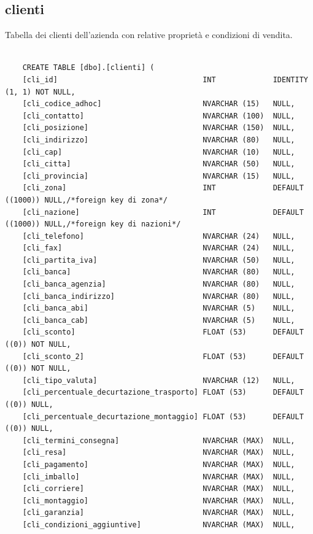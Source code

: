 \documentclass[12pt]{article}
\begin{document}
\subsection{clienti}
Tabella dei clienti dell'azienda con relative proprietà e condizioni di vendita.
\begin{lstlisting}

    CREATE TABLE [dbo].[clienti] (
    [cli_id]                                 INT             IDENTITY (1, 1) NOT NULL,
    [cli_codice_adhoc]                       NVARCHAR (15)   NULL,
    [cli_contatto]                           NVARCHAR (100)  NULL,
    [cli_posizione]                          NVARCHAR (150)  NULL,
    [cli_indirizzo]                          NVARCHAR (80)   NULL,
    [cli_cap]                                NVARCHAR (10)   NULL,
    [cli_citta]                              NVARCHAR (50)   NULL,
    [cli_provincia]                          NVARCHAR (15)   NULL,
    [cli_zona]                               INT             DEFAULT ((1000)) NULL,/*foreign key di zona*/
    [cli_nazione]                            INT             DEFAULT ((1000)) NULL,/*foreign key di nazioni*/
    [cli_telefono]                           NVARCHAR (24)   NULL,
    [cli_fax]                                NVARCHAR (24)   NULL,
    [cli_partita_iva]                        NVARCHAR (50)   NULL,
    [cli_banca]                              NVARCHAR (80)   NULL,
    [cli_banca_agenzia]                      NVARCHAR (80)   NULL,
    [cli_banca_indirizzo]                    NVARCHAR (80)   NULL,
    [cli_banca_abi]                          NVARCHAR (5)    NULL,
    [cli_banca_cab]                          NVARCHAR (5)    NULL,
    [cli_sconto]                             FLOAT (53)      DEFAULT ((0)) NOT NULL,
    [cli_sconto_2]                           FLOAT (53)      DEFAULT ((0)) NOT NULL,
    [cli_tipo_valuta]                        NVARCHAR (12)   NULL,
    [cli_percentuale_decurtazione_trasporto] FLOAT (53)      DEFAULT ((0)) NULL,
    [cli_percentuale_decurtazione_montaggio] FLOAT (53)      DEFAULT ((0)) NULL,
    [cli_termini_consegna]                   NVARCHAR (MAX)  NULL,
    [cli_resa]                               NVARCHAR (MAX)  NULL,
    [cli_pagamento]                          NVARCHAR (MAX)  NULL,
    [cli_imballo]                            NVARCHAR (MAX)  NULL,
    [cli_corriere]                           NVARCHAR (MAX)  NULL,
    [cli_montaggio]                          NVARCHAR (MAX)  NULL,
    [cli_garanzia]                           NVARCHAR (MAX)  NULL,
    [cli_condizioni_aggiuntive]              NVARCHAR (MAX)  NULL,

\end{lstlisting}
\end{document}
